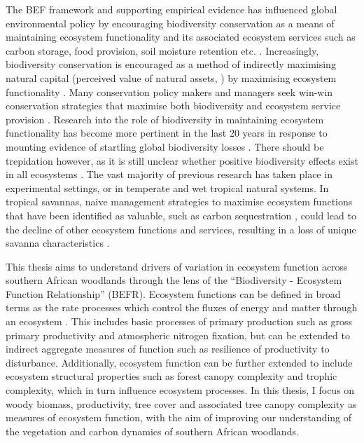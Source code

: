 \begin{refsection}
The BEF framework and supporting empirical evidence has influenced global environmental policy by encouraging biodiversity conservation as a means of maintaining ecosystem functionality and its associated ecosystem services such as carbon storage, food provision, soil moisture retention etc. \citep{Balvanera2014, Naeem2012}. Increasingly, biodiversity conservation is encouraged as a method of indirectly maximising natural capital (perceived value of natural assets, \citealt{Kareiva2011}) by maximising ecosystem functionality \citep{Scherer-Lorenzen2014, Cardinale2012}. Many conservation policy makers and managers seek win-win conservation strategies that maximise both biodiversity and ecosystem service provision \citep{Howe2014, Adams2004}. Research into the role of biodiversity in maintaining ecosystem functionality has become more pertinent in the last 20 years in response to mounting evidence of startling global biodiversity losses \citep{McRae2017, Butchart2010, Vitousek1997}. There should be trepidation however, as it is still unclear whether positive biodiversity effects exist in all ecosystems \citep{Sheil2020}. The vast majority of previous research has taken place in experimental settings, or in temperate and wet tropical natural systems. In tropical savannas, naive management strategies to maximise ecosystem functions that have been identified as valuable, such as carbon sequestration \citep{Duffy2017}, could lead to the decline of other ecosystem functions and services, resulting in a loss of unique savanna characteristics \citep{Brockerhoff2017, Srivastava2005a}. 

This thesis aims to understand drivers of variation in ecosystem function across southern African woodlands through the lens of the ``Biodiversity - Ecosystem Function Relationship'' (BEFR). Ecosystem functions can be defined in broad terms as the rate processes which control the fluxes of energy and matter through an ecosystem \citep{Jax2005}. This includes basic processes of primary production such as gross primary productivity and atmospheric nitrogen fixation, but can be extended to indirect aggregate measures of function such as resilience of productivity to disturbance. Additionally, ecosystem function can be further extended to include ecosystem structural properties such as forest canopy complexity and trophic complexity, which in turn influence ecosystem processes. In this thesis, I focus on woody biomass, productivity, tree cover and associated tree canopy complexity as measures of ecosystem function, with the aim of improving our understanding of the vegetation and carbon dynamics of southern African woodlands.


\end{refsection}
